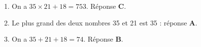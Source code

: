 \documentclass[10pt]{article}
\begin{document}
%      
\begin{enumerate}
\item On a $35 \times 21 + 18 = 753$. Réponse \textbf{C}.
\item Le plus grand des deux nombres 35 et 21 est 35 : réponse \textbf{A}.
\item On a $35 + 21 + 18 = 74$. Réponse \textbf{B}.
\end{enumerate}
\end{document}
